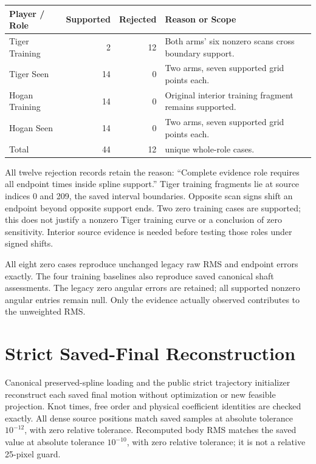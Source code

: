 \documentclass[11pt,letterpaper]{article}
\begin{document}
\begin{center}\begin{tabular}{@{}lrr>{\raggedright\arraybackslash}p{.39\linewidth}@{}}\toprule
Player / Role & Supported & Rejected & Reason or Scope\\\midrule
Tiger Training & 2 & 12 & Both arms' six nonzero scans cross boundary support.\\
Tiger Seen & 14 & 0 & Two arms, seven supported grid points each.\\
Hogan Training & 14 & 0 & Original interior training fragment remains supported.\\
Hogan Seen & 14 & 0 & Two arms, seven supported grid points each.\\\midrule
Total & 44 & 12 & 56 unique whole-role cases.\\\bottomrule
\end{tabular}\end{center}

All twelve rejection records retain the reason: ``Complete evidence role requires
all endpoint times inside spline support.'' Tiger training fragments lie at source
indices 0 and 209, the saved interval boundaries. Opposite scan signs shift an
endpoint beyond opposite support ends. Two zero training cases are supported;
this does not justify a nonzero Tiger training curve or a conclusion of zero sensitivity.
Interior source evidence is needed before testing those roles under signed shifts.

All eight zero cases reproduce unchanged legacy raw RMS and endpoint errors exactly.
The four training baselines also reproduce saved canonical shaft assessments.
The legacy zero angular errors are retained; all supported nonzero angular entries
remain null. Only the evidence actually observed contributes to the unweighted RMS.

\section{Strict Saved-Final Reconstruction}
Canonical preserved-spline loading and the public strict trajectory initializer
reconstruct each saved final motion without optimization or new feasible projection.
Knot times, free order and physical coefficient identities are checked exactly.
All dense source positions match saved samples at absolute tolerance $10^{-12}$,
with zero relative tolerance. Recomputed body RMS matches the saved value at absolute
tolerance $10^{-10}$, with zero relative tolerance; it is not a relative 25-pixel guard.
\end{document}
